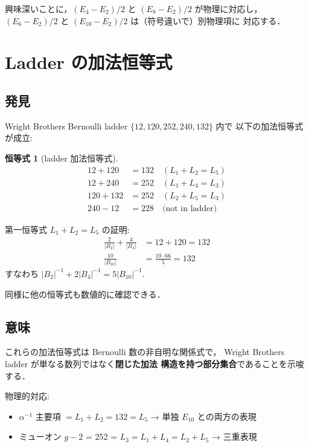 \documentclass[11pt,a4paper]{article}
\newtheorem{identity}{恒等式}
\begin{document}
興味深いことに，$(E_4 - E_2)/2$ と $(E_8 - E_2)/2$ が物理に対応し，
$(E_6 - E_2)/2$ と $(E_{10} - E_2)/2$ は（符号違いで）別物理項に
対応する．

\section{Ladder の加法恒等式}

\subsection{発見}

Wright Brothers Bernoulli ladder $\{12, 120, 252, 240, 132\}$ 内で
以下の加法恒等式が成立:

\begin{identity}[ladder 加法恒等式]
\begin{align}
12 + 120 &= 132 \quad (L_1 + L_2 = L_5)\\
12 + 240 &= 252 \quad (L_1 + L_4 = L_3)\\
120 + 132 &= 252 \quad (L_2 + L_5 = L_3)\\
240 - 12 &= 228 \quad \text{(not in ladder)}
\end{align}
\end{identity}

第一恒等式 $L_1 + L_2 = L_5$ の証明:
\begin{align}
\frac{2}{|B_2|} + \frac{4}{|B_4|} &= 12 + 120 = 132\\
\frac{10}{|B_{10}|} &= \frac{10 \cdot 66}{5} = 132
\end{align}
すなわち $|B_2|^{-1} + 2|B_4|^{-1} = 5|B_{10}|^{-1}$.

同様に他の恒等式も数値的に確認できる．

\subsection{意味}

これらの加法恒等式は Bernoulli 数の非自明な関係式で，
Wright Brothers ladder が単なる数列ではなく\textbf{閉じた加法
構造を持つ部分集合}であることを示唆する．

物理的対応:
\begin{itemize}
\item $\alpha^{-1}$ 主要項 $= L_1 + L_2 = 132 = L_5$ → 単独 $E_{10}$
との両方の表現
\item ミューオン $g-2$ = 252 = $L_3 = L_1 + L_4 = L_2 + L_5$ →
三重表現
\end{itemize}
\end{document}

